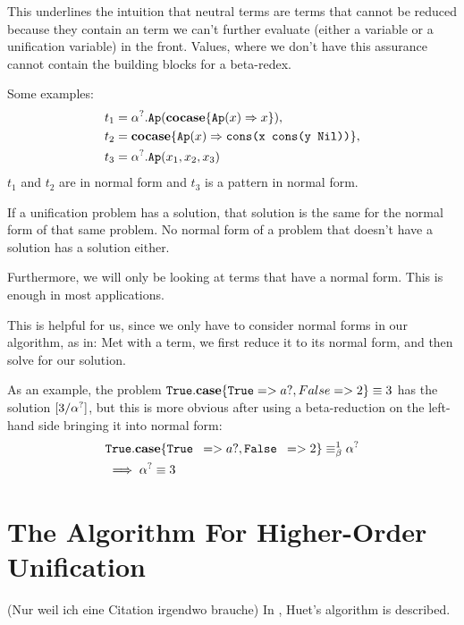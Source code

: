 \documentclass[twoside,12pt,a4paper]{article}
\begin{document}
This underlines the intuition that neutral terms are terms that cannot be reduced because
they contain an term we can't further evaluate (either a variable or a unification variable) in the front.
Values, where we don't have this assurance cannot contain the building blocks for a beta-redex.

Some examples: 
\begin{align*}
    \begin{split}
        t_1 &= \alpha^?.\texttt{Ap}(\textbf{cocase}\{\texttt{Ap}(x)\Rightarrow x\}), \\
        t_2 &= \textbf{cocase}\{\texttt{Ap}(x)\Rightarrow \texttt{cons(x cons(y Nil))}\},   \\
        t_3 &= \alpha^?.\texttt{Ap}(x_1, x_2, x_3)
    \end{split}    
\end{align*}
$t_1$ and $t_2$ are in normal form and $t_3$ is a pattern in normal form.

\begin{theorem}
    If a unification problem has a solution, that solution is the same for the normal form of that same problem. 
    No normal form of a problem that doesn't have a solution has a solution either.
\end{theorem}

Furthermore, we will only be looking at terms that have a normal form. This is enough in most applications. %

This is helpful for us, since we only have to consider normal forms in our algorithm, as in: 
Met with a term, we first reduce it to its normal form, and then solve for our solution.

As an example, the problem $\texttt{True}.\textbf{case} \{ \texttt{True} => a?, False => 2 \} \equiv 3 $ has the solution $[3/\alpha^?]$, 
but this is more obvious after using a beta-reduction on the left-hand side bringing it into normal form:
\begin{align*}
    &\texttt{True}.\textbf{case} \{ \texttt{True } => a?, \texttt{False } => 2 \} \equiv_{\beta}^1 \alpha^?  \\
    &\implies \alpha^? \equiv 3   
\end{align*}



\section{The Algorithm For Higher-Order Unification}
(Nur weil ich eine Citation irgendwo brauche)
In \cite{DBLP:books/el/RV01/Dowek01}, Huet's algorithm is described. %
\end{document}

